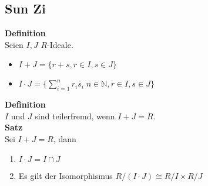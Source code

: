 \documentclass[a4paper, 12pt]{article}
\begin{document}
\subsection{Sun Zi}
\textbf{Definition}\\
Seien $I, J$ $R$-Ideale. \begin{itemize}
	\item $I+J = \{r+s, r \in I, s \in J\}$
	\item $I\cdot J = \{\sum_{i=1}^{n} r_is_i\; n \in \mathbb{N}, r \in I, s \in J\}$
\end{itemize}
\textbf{Definition}\\
$I$ und $J$ sind teilerfremd, wenn $I+J = R$.\\
\textbf{Satz}\\
Sei $I+J=R$, dann \begin{enumerate}
	\item $I\cdot J = I\cap J$
	\item Es gilt der Isomorphismus $R/(I\cdot J) \cong R/I \times R/J$
\end{enumerate}
\end{document}

